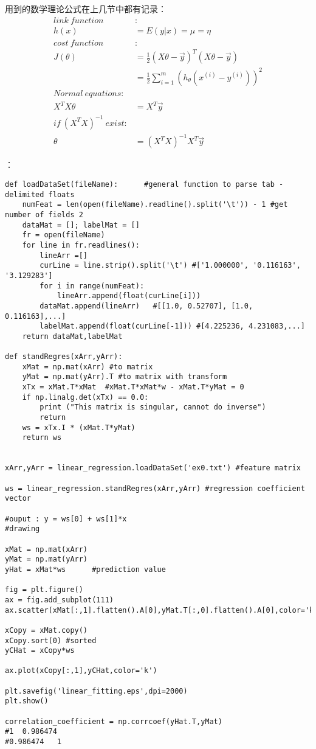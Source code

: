 用到的数学理论公式在上几节中都有记录：
\begin{equation}\nonumber
\begin{split}
 link~function~&:\\
 h(x) &=E(y|x)=\mu=\eta\\
 cost~function~&:\\
 J(\theta)&=\frac{1}{2}(X\theta-\vec{y})^T (X\theta-\vec{y})\\
         &=\frac{1}{2}\sum_{i=1}^{m}(h_\theta(x^{(i)}-y^{(i)}))^2\\
Normal~equations:&\\
X^TX\theta &=X^T\vec{y}\\
if~(X^TX)^{-1}~exist:&\\
\theta&=(X^TX)^{-1}X^T\vec{y}
\end{split}
\end{equation}

：
\begin{lstlisting}
def loadDataSet(fileName):      #general function to parse tab -delimited floats
    numFeat = len(open(fileName).readline().split('\t')) - 1 #get number of fields 2
    dataMat = []; labelMat = []
    fr = open(fileName)
    for line in fr.readlines():
        lineArr =[]
        curLine = line.strip().split('\t') #['1.000000', '0.116163', '3.129283']
        for i in range(numFeat):
            lineArr.append(float(curLine[i]))
        dataMat.append(lineArr)   #[[1.0, 0.52707], [1.0, 0.116163],...]
        labelMat.append(float(curLine[-1])) #[4.225236, 4.231083,...]
    return dataMat,labelMat

def standRegres(xArr,yArr):
    xMat = np.mat(xArr) #to matrix
    yMat = np.mat(yArr).T #to matrix with transform
    xTx = xMat.T*xMat  #xMat.T*xMat*w - xMat.T*yMat = 0
    if np.linalg.det(xTx) == 0.0:
        print ("This matrix is singular, cannot do inverse")
        return
    ws = xTx.I * (xMat.T*yMat)
    return ws


xArr,yArr = linear_regression.loadDataSet('ex0.txt') #feature matrix

ws = linear_regression.standRegres(xArr,yArr) #regression coefficient vector

#ouput : y = ws[0] + ws[1]*x
#drawing

xMat = np.mat(xArr)
yMat = np.mat(yArr)
yHat = xMat*ws      #prediction value

fig = plt.figure()
ax = fig.add_subplot(111)
ax.scatter(xMat[:,1].flatten().A[0],yMat.T[:,0].flatten().A[0],color='k')

xCopy = xMat.copy()
xCopy.sort(0) #sorted
yCHat = xCopy*ws

ax.plot(xCopy[:,1],yCHat,color='k')

plt.savefig('linear_fitting.eps',dpi=2000)
plt.show()

correlation_coefficient = np.corrcoef(yHat.T,yMat)
#1	0.986474
#0.986474	1
\end{lstlisting}

